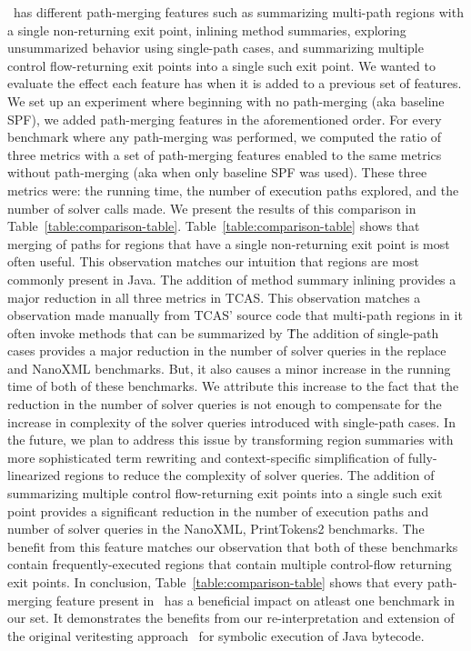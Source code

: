 \tool\ has different path-merging features such as summarizing multi-path regions with a single non-returning exit
point, inlining method summaries, exploring unsummarized behavior using single-path cases, and summarizing multiple
control flow-returning exit points into a single such exit point.
%
We wanted to evaluate the effect each feature has when it is added to a previous set of features.
%
We set up an experiment where beginning with no path-merging (aka baseline SPF), we added path-merging features in the
aforementioned order.
%
For every benchmark where any path-merging was performed, we computed the ratio of three metrics with a set of
path-merging features enabled to the same metrics without path-merging (aka when only baseline SPF was used).
%
These three metrics were: the running time, the number of execution paths explored, and the number of solver calls made.
%
We present the results of this comparison in Table~\ref{table:comparison-table}.
%
Table~\ref{table:comparison-table} shows that merging of paths for regions that have a single non-returning exit point
is most often useful.
%
This observation matches our intuition that regions are most commonly present in Java.
%
The addition of method summary inlining provides a major reduction in all three metrics in TCAS.
%
This observation matches a observation made manually from TCAS' source code that multi-path regions in it often invoke
methods that can be summarized by \tool\.
%
The addition of single-path cases provides a major reduction in the number of solver queries in the replace and
NanoXML benchmarks.
%
But, it also causes a minor increase in the running time of both of these benchmarks.
%
We attribute this increase to the fact that the reduction in the number of solver queries is not enough to compensate
for the increase in complexity of the solver queries introduced with single-path cases.
%
In the future, we plan to address this issue by transforming region summaries with more sophisticated term rewriting
and context-specific simplification of fully-linearized regions to reduce the complexity of solver queries.
%
The addition of summarizing multiple control flow-returning exit points into a single such exit point provides a
significant reduction in the number of execution paths and number of solver queries in the NanoXML, PrintTokens2
benchmarks.
%
The benefit from this feature matches our observation that both of these benchmarks contain frequently-executed
regions that contain multiple control-flow returning exit points.
%
In conclusion, Table~\ref{table:comparison-table} shows that every path-merging feature present in \tool\ has a
beneficial impact on atleast one benchmark in our set.
%
It demonstrates the benefits from our re-interpretation and extension of the original veritesting approach~\cite{veritesting}
for symbolic execution of Java bytecode.